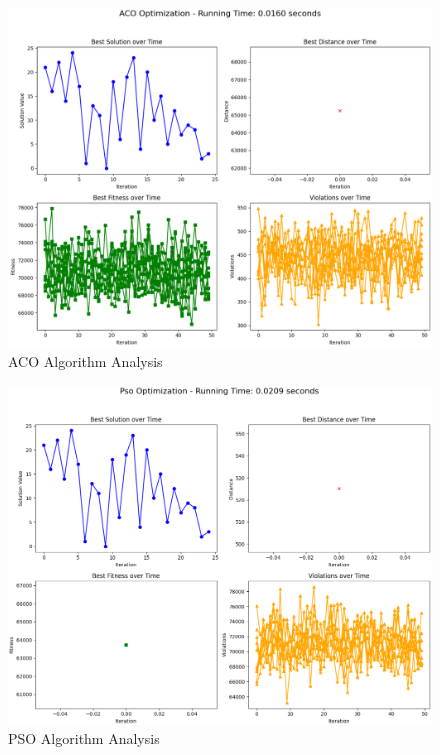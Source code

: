 \begin{figure}[H]  %
    \centering
    \includegraphics[width=1\linewidth]{figures/Aco_Results.PNG}
    \caption{ACO Algorithm Analysis}
    \label{fig:ACO_Analysis}
\end{figure}

\begin{figure}[H]  %
    \centering
    \includegraphics[width=1\linewidth]{figures/Pso_Results.PNG}
    \caption{PSO Algorithm Analysis}
    \label{fig:PSO_Analysis}
\end{figure}

 


